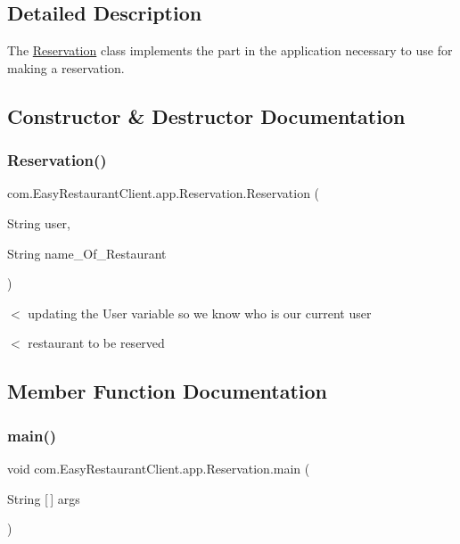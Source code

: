 \subsection{Detailed Description}
The \mbox{\hyperlink{classcom_1_1_easy_restaurant_client_1_1app_1_1_reservation}{Reservation}} class implements the part in the application necessary to use for making a reservation. 

\subsection{Constructor \& Destructor Documentation}
\mbox{\label{classcom_1_1_easy_restaurant_client_1_1app_1_1_reservation_a2b41c3f3b0c4c91a7538e43a6d61c095}} 
\subsubsection{\texorpdfstring{Reservation()}{Reservation()}}
{\footnotesize\ttfamily com.\+Easy\+Restaurant\+Client.\+app.\+Reservation.\+Reservation (\begin{DoxyParamCaption}\item[{String}]{user,  }\item[{String}]{name\+\_\+\+Of\+\_\+\+Restaurant }\end{DoxyParamCaption})}

$<$ updating the User variable so we know who is our current user

$<$ restaurant to be reserved 

\subsection{Member Function Documentation}
\mbox{\label{classcom_1_1_easy_restaurant_client_1_1app_1_1_reservation_ac3b82538dfb0d956e34cde70714680bb}} 
\subsubsection{\texorpdfstring{main()}{main()}}
{\footnotesize\ttfamily void com.\+Easy\+Restaurant\+Client.\+app.\+Reservation.\+main (\begin{DoxyParamCaption}\item[{String \mbox{[}$\,$\mbox{]}}]{args }\end{DoxyParamCaption})}

